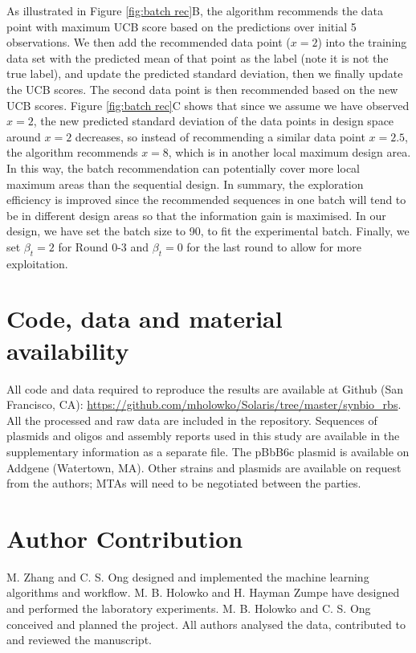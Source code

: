 \documentclass{scrartcl}[2013/05/29]%
\begin{document}
As illustrated in Figure \ref{fig:batch rec}B, the algorithm recommends the data point with maximum UCB score based on the predictions over initial 5 observations.  
We then add the recommended data point ($x = 2$) into the training data set with the predicted mean of that point as the label (note it is not the true label), and update the predicted standard deviation, then we finally update the UCB scores. 
The second data point is then recommended based on the new UCB scores.   
Figure \ref{fig:batch rec}C shows that since we assume we have observed $x = 2$, the new predicted standard deviation of the data points in design space around $x =2$  decreases, so instead of recommending a similar data point $x = 2.5$, the algorithm recommends $x = 8$, which is in another local maximum design area. 
In this way, the batch recommendation can potentially cover more local maximum areas than the sequential design. 
In summary, the exploration efficiency is improved since the recommended sequences in one batch will tend to be in different design areas so that the information gain is maximised. 
In our design, we have set the batch size to 90, to fit the experimental batch.
Finally, we set $\beta_t = 2$ for Round 0-3 and $\beta_t = 0$ for the last round to allow for more exploitation.


\section*{Code, data and material availability}

All code and data required to reproduce the results are available at Github (San Francisco, CA): \url{https://github.com/mholowko/Solaris/tree/master/synbio_rbs}.
All the processed and raw data are included in the repository.
Sequences of plasmids and oligos and assembly reports used in this study are available in the supplementary information as a separate file.
The pBbB6c plasmid is available on Addgene (Watertown, MA). Other strains and plasmids are available on request from the authors; MTAs will need to be negotiated between the parties.


\section*{Author Contribution}
M. Zhang and C. S. Ong  designed and implemented the machine learning algorithms and workflow. M. B. Holowko and H. Hayman Zumpe have designed and performed the laboratory experiments. M. B. Holowko and C. S. Ong conceived and planned the project. All authors analysed the data, contributed to and reviewed the manuscript.
\end{document}
